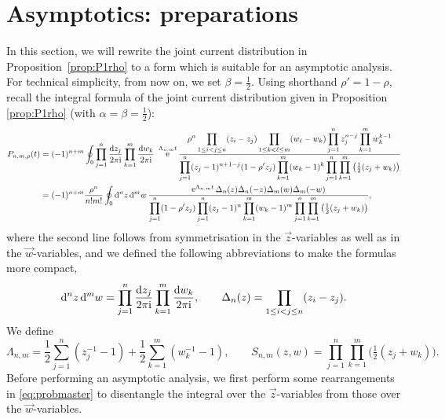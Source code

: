 \documentclass[cmp]{svjour}
\numberwithin{theorem}{section}
\numberwithin{equation}{section}
\DeclareMathOperator{\e}{e}
\def\dd{{\rm d}}
\def\ii{{\rm i}}
\begin{document}
\section{Asymptotics: preparations}
\label{se:scalinglimit}
In this section, we will rewrite the joint current distribution in Proposition~\ref{prop:P1rho} to a form which is suitable for an asymptotic analysis. For technical simplicity, from now on, we set $\beta=\tfrac12$.
Using shorthand $\rho'=1-\rho$, recall the integral formula of the joint current distribution given in Proposition \ref{prop:P1rho} (with $\alpha=\beta=\frac12$):
\begin{align}
\label{eq:probmaster}
P_{n,m,\rho}(t) &= (-1)^{n+m}  \oint_0 \prod_{j=1}^n \frac{\dd z_j }{2\pi \ii} \prod_{k=1}^m
\frac{\dd w_k }{2\pi \ii}\ \e^{\Lambda_{n,m} t} \frac{\displaystyle \rho^n \prod_{1\le i<j\le n} (z_i-z_j) \prod_{1\le k< \ell \le m} (w_\ell -w_k) \prod_{j=1}^n z_j^{n-j} \prod_{k=1}^m w_k^{k-1}}
{\displaystyle \prod_{j=1}^n (z_j-1)^{n+1-j} (1- \rho' z_j)
\prod_{k=1}^m (w_k-1)^{k} \prod_{j=1}^n \prod_{k=1}^m \big(\tfrac12(z_j + w_k)\big)} \nonumber \\
&=  (-1)^{n+m} \frac{\rho^n }{n!m!} \oint_0 \dd^n z\, \dd^m w\, \frac{ \e^{\Lambda_{n,m} t}  \Delta_n(z) \Delta_n(-z) \Delta_m(w) \Delta_m(-w)}  
{\displaystyle \prod_{j=1}^n (1- \rho' z_j)  \prod_{j=1}^n (z_j-1)^{n} \prod_{k=1}^m (w_k-1)^{m} \prod_{j=1}^n \prod_{k=1}^m \big(\tfrac12(z_j + w_k)\big)},
 \end{align}
%
where the second line follows from symmetrisation in the $\vec{z}$-variables as well as in the $\vec{w}$-variables, and we defined the following abbreviations to make the formulas more compact,
\begin{equation*}
\dd^n z\, \dd^m w= \prod_{j=1}^n \frac{\dd z_j }{2\pi \ii} \prod_{k=1}^m
\frac{\dd w_k }{2\pi \ii},\qquad
\Delta_n(z) = \prod_{1 \le i < j\le n} (z_i-z_j).
\end{equation*}
We define
\[
\Lambda_{n,m} = \frac12 \sum_{j=1}^n (z_j^{-1}-1) + \frac12 \sum_{k=1}^m (w_k^{-1}-1),
\qquad
S_{n,m}(z,w)=\prod_{j=1}^n \prod_{k=1}^m \big(\tfrac12(z_j + w_k)\big).
\]
Before performing an asymptotic analysis, we first perform some rearrangements in \eqref{eq:probmaster} to disentangle the integral over the $\vec{z}$-variables from those over the $\vec{w}$-variables.
\end{document}
